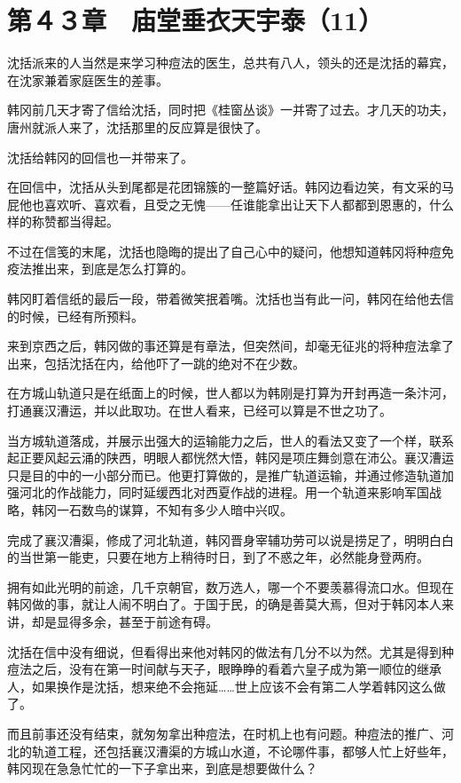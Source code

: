 \section{第４３章　庙堂垂衣天宇泰（11）}

沈括派来的人当然是来学习种痘法的医生，总共有八人，领头的还是沈括的幕宾，在沈家兼着家庭医生的差事。

韩冈前几天才寄了信给沈括，同时把《桂窗丛谈》一并寄了过去。才几天的功夫，唐州就派人来了，沈括那里的反应算是很快了。

沈括给韩冈的回信也一并带来了。

在回信中，沈括从头到尾都是花团锦簇的一整篇好话。韩冈边看边笑，有文采的马屁他也喜欢听、喜欢看，且受之无愧——任谁能拿出让天下人都都到恩惠的，什么样的称赞都当得起。

不过在信笺的末尾，沈括也隐晦的提出了自己心中的疑问，他想知道韩冈将种痘免疫法推出来，到底是怎么打算的。

韩冈盯着信纸的最后一段，带着微笑抿着嘴。沈括也当有此一问，韩冈在给他去信的时候，已经有所预料。

来到京西之后，韩冈做的事还算是有章法，但突然间，却毫无征兆的将种痘法拿了出来，包括沈括在内，给他吓了一跳的绝对不在少数。

在方城山轨道只是在纸面上的时候，世人都以为韩刚是打算为开封再造一条汴河，打通襄汉漕运，并以此取功。在世人看来，已经可以算是不世之功了。

当方城轨道落成，并展示出强大的运输能力之后，世人的看法又变了一个样，联系起正要风起云涌的陕西，明眼人都恍然大悟，韩冈是项庄舞剑意在沛公。襄汉漕运只是目的中的一小部分而已。他更打算做的，是推广轨道运输，并通过修造轨道加强河北的作战能力，同时延缓西北对西夏作战的进程。用一个轨道来影响军国战略，韩冈一石数鸟的谋算，不知有多少人暗中兴叹。

完成了襄汉漕渠，修成了河北轨道，韩冈晋身宰辅功劳可以说是捞足了，明明白白的当世第一能吏，只要在地方上稍待时日，到了不惑之年，必然能身登两府。

拥有如此光明的前途，几千京朝官，数万选人，哪一个不要羡慕得流口水。但现在韩冈做的事，就让人闹不明白了。于国于民，的确是善莫大焉，但对于韩冈本人来讲，却是显得多余，甚至于前途有碍。

沈括在信中没有细说，但看得出来他对韩冈的做法有几分不以为然。尤其是得到种痘法之后，没有在第一时间献与天子，眼睁睁的看着六皇子成为第一顺位的继承人，如果换作是沈括，想来绝不会拖延……世上应该不会有第二人学着韩冈这么做了。

而且前事还没有结束，就匆匆拿出种痘法，在时机上也有问题。种痘法的推广、河北的轨道工程，还包括襄汉漕渠的方城山水道，不论哪件事，都够人忙上好些年，韩冈现在急急忙忙的一下子拿出来，到底是想要做什么？

